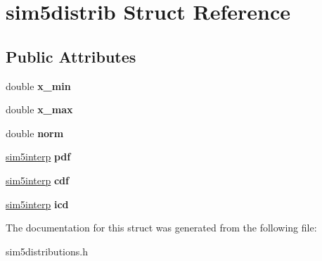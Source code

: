 \hypertarget{structsim5distrib}{}\section{sim5distrib Struct Reference}
\label{structsim5distrib}
\subsection*{Public Attributes}
\begin{DoxyCompactItemize}
\item 
\mbox{\label{structsim5distrib_a03027238e4318d40d767338d2298899f}} 
double {\bfseries x\+\_\+min}
\item 
\mbox{\label{structsim5distrib_af18c6b2da5b7e05f5bba5cca180b0ef4}} 
double {\bfseries x\+\_\+max}
\item 
\mbox{\label{structsim5distrib_a5e17ff0a7d98be045ca22f390aaa97f5}} 
double {\bfseries norm}
\item 
\mbox{\label{structsim5distrib_a0ac3cf77eecc19123503475836526103}} 
\hyperlink{structsim5interp}{sim5interp} {\bfseries pdf}
\item 
\mbox{\label{structsim5distrib_ac70612169910646ff081295246d9c95b}} 
\hyperlink{structsim5interp}{sim5interp} {\bfseries cdf}
\item 
\mbox{\label{structsim5distrib_a07c2b7e53c4dfa4fa90f1adc751d727b}} 
\hyperlink{structsim5interp}{sim5interp} {\bfseries icd}
\end{DoxyCompactItemize}


The documentation for this struct was generated from the following file\+:\begin{DoxyCompactItemize}
\item 
sim5distributions.\+h\end{DoxyCompactItemize}
